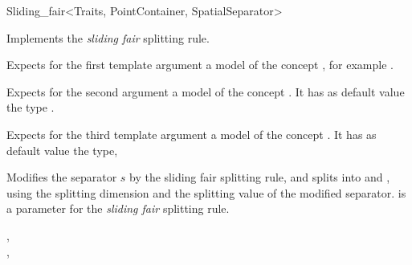 

\begin{ccRefFunctionObjectClass}{Sliding_fair<Traits, PointContainer, SpatialSeparator>}


\ccDefinition
Implements the {\em sliding fair} splitting rule.


\ccParameters

Expects for the first template argument a model of
the concept , 
for example . 

Expects for the second argument a model of the concept . It has as default value
the type .

Expects for the third template argument a model of the concept . It has as default value
the type, 


\ccIsModel


\ccTypes



\ccOperations

{Modifies the separator $s$ by the sliding fair splitting rule, 
and splits  into  and ,
using the splitting dimension and the splitting value of the modified separator.
 is a parameter for the {\em sliding fair} splitting rule.
}

\ccSeeAlso

,\\
,\\

\end{ccRefFunctionObjectClass}



